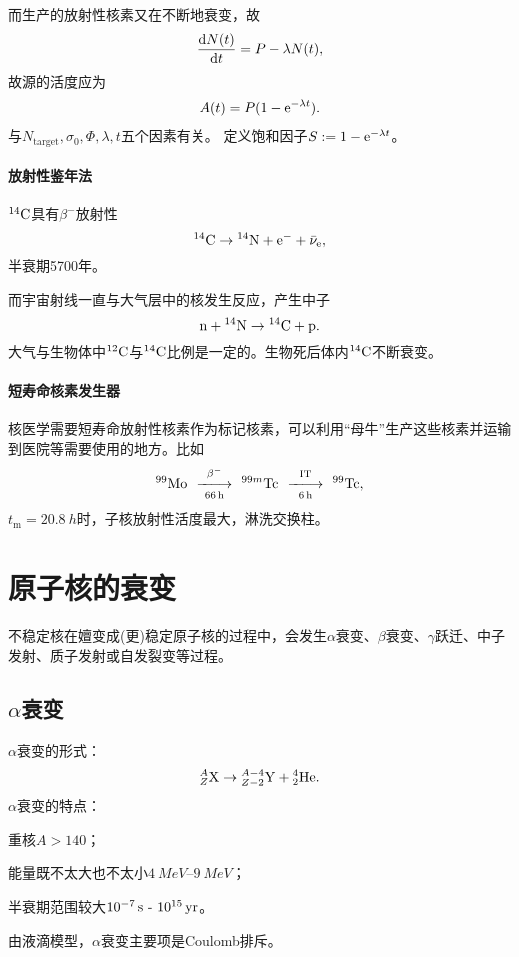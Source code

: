而生产的放射性核素又在不断地衰变，故
\[
	\frac{\mathrm{d}^{\;\!\!}N(t)}{\mathrm{d} t^{\;\!\!}}=P-\lambda N(t),
\]
故源的活度应为
\begin{align}
	A(t)=P(1-\mathop{}\!\mathrm{e}^{-\lambda t}).
\end{align}
与$N_{\mathrm{target}},\sigma_0,\Phi,\lambda,t$五个因素有关。
定义饱和因子$S:=1-\mathop{}\!\mathrm{e}^{-\lambda t}$。
\paragraph{放射性鉴年法}${^{14}\mathrm{C}}$具有$\beta^-$放射性
\[
	{^{14}\mathrm{C}}\to{^{14}\mathrm{N}}+\mathrm e^-+\bar\nu_\mathrm e,
\]
半衰期5700年。

而宇宙射线一直与大气层中的核发生反应，产生中子
\[
	\mathrm n+{^{14}\mathrm{N}}\to{^{14}\mathrm{C}}+\mathrm p.
\]
大气与生物体中${^{12}\mathrm{C}}$与${^{14}\mathrm{C}}$比例是一定的。生物死后体内${^{14}\mathrm{C}}$不断衰变。
\paragraph{短寿命核素发生器}
核医学需要短寿命放射性核素作为标记核素，可以利用“母牛”生产这些核素并运输到医院等需要使用的地方。比如
\[
	{^{99}\mathrm{Mo}}\enspace\mathop{-\hspace{-4 pt}-\hspace{-5 pt}\longrightarrow}\limits^{\beta^-}_{\SI{66}{h}}\enspace{^{99m}\mathrm{Tc}}\enspace\mathop{-\hspace{-4 pt}-\hspace{-5 pt}\longrightarrow}\limits^{\mathrm{IT}}_{\SI{6}{h}}\enspace{^{99}\mathrm{Tc}},
\]
$t_\mathrm m=\SI{20.8}{h}$时，子核放射性活度最大，淋洗交换柱。
\clearpage
\section{原子核的衰变}
不稳定核在嬗变成(更)稳定原子核的过程中，会发生$\alpha$衰变、$\beta$衰变、$\gamma$跃迁、中子发射、质子发射或自发裂变等过程。

\subsection[\textit{\textalpha}衰变]{$\alpha$衰变}
$\alpha$衰变的形式：
\begin{align}
	{^A_Z\mathrm{X}} \to {^{A-4}_{Z-2}\mathrm{Y}} + {^4_2\mathrm{He}}.
\end{align}
$\alpha$衰变的特点：
\begin{compactenum}
	\item 重核$A>140$；
	\item 能量既不太大也不太小$\SIrange{4}{9}{MeV}$；
	\item 半衰期范围较大$\SI{e-7}{s}~\text{-}~\SI{e15}{yr}$。
\end{compactenum}
由液滴模型，$\alpha$衰变主要项是Coulomb排斥。

